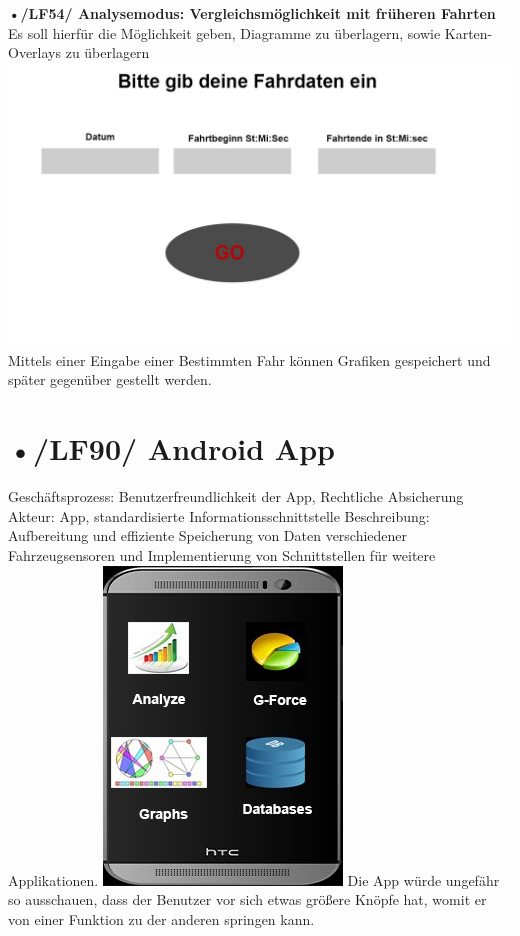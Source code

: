 \textbf{•/LF54/ Analysemodus: Vergleichsmöglichkeit mit früheren Fahrten}
Es soll hierfür die Möglichkeit geben, Diagramme zu überlagern, sowie Karten-Overlays zu überlagern 
 \includegraphics[scale=0.5]{images/LF54_Fahrdaten.jpg}
Mittels einer Eingabe einer Bestimmten Fahr können Grafiken gespeichert und später gegenüber gestellt werden. 



\section{•/LF90/ Android App}
Geschäftsprozess:	Benutzerfreundlichkeit der App, Rechtliche Absicherung
Akteur:			App, standardisierte Informationsschnittstelle
Beschreibung:	Aufbereitung und effiziente Speicherung von Daten verschiedener Fahrzeugsensoren und Implementierung von Schnittstellen für weitere Applikationen. 
 \includegraphics[scale=0.5]{images/LF90_App.jpg}
Die App würde ungefähr so ausschauen, dass der Benutzer vor sich etwas größere Knöpfe hat,                                        
womit er von einer Funktion zu der anderen springen kann.

